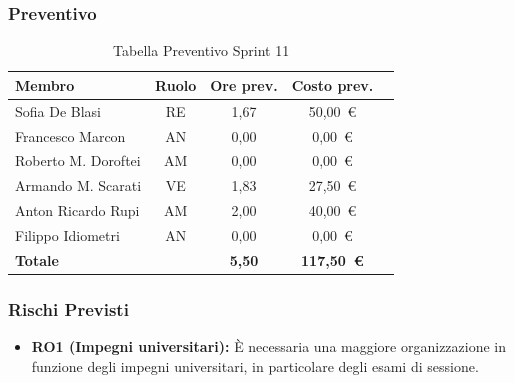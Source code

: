 \subsubsection{Preventivo}
\begin{table}[H]
    \centering
    \renewcommand{\arraystretch}{1.3}
    \begin{tabularx}{\textwidth}{|X|c|c|c|r|}
        \hline
        \textbf{Membro} & \textbf{Ruolo} & \textbf{Ore prev.} & \textbf{Costo prev.} \\
        \hline
        Sofia De Blasi       & RE & 1,67 & 50{,}00~\euro \\
        Francesco Marcon     & AN & 0,00 & 0{,}00~\euro \\
        Roberto M. Doroftei  & AM & 0,00 & 0{,}00~\euro \\
        Armando M. Scarati   & VE & 1,83 & 27{,}50~\euro \\
        Anton Ricardo Rupi   & AM & 2,00 & 40{,}00~\euro \\
        Filippo Idiometri    & AN & 0,00 & 0{,}00~\euro \\
        \hline
        \textbf{Totale}      &    & \textbf{5,50} & \textbf{117{,}50~\euro} \\
        \hline
    \end{tabularx}
    \caption{Tabella Preventivo Sprint 11} 
\end{table}

\subsubsection{Rischi Previsti}
\begin{itemize}
    \item \textbf{RO1 (Impegni universitari):} È necessaria una maggiore organizzazione in funzione degli impegni universitari, in particolare degli esami di sessione.
\end{itemize}

